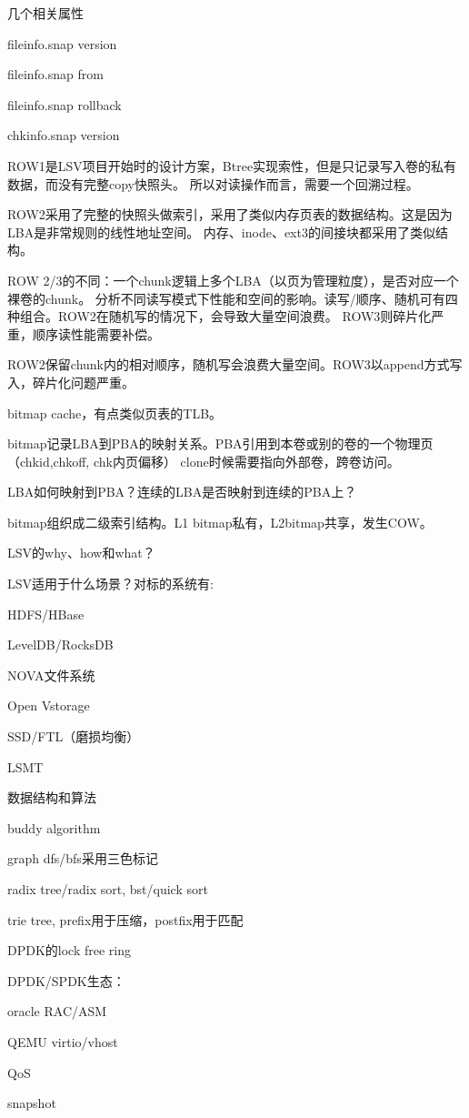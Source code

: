 几个相关属性
\begin{enumbox}
\item fileinfo.snap version
\item fileinfo.snap from
\item fileinfo.snap rollback
\item chkinfo.snap version
\end{enumbox}

\hrulefill

ROW1是LSV项目开始时的设计方案，Btree实现索性，但是只记录写入卷的私有数据，而没有完整copy快照头。
所以对读操作而言，需要一个回溯过程。

ROW2采用了完整的快照头做索引，采用了类似内存页表的数据结构。这是因为LBA是非常规则的线性地址空间。
内存、inode、ext3的间接块都采用了类似结构。

ROW 2/3的不同：一个chunk逻辑上多个LBA（以页为管理粒度），是否对应一个裸卷的chunk。
分析不同读写模式下性能和空间的影响。读写/顺序、随机可有四种组合。ROW2在随机写的情况下，会导致大量空间浪费。
ROW3则碎片化严重，顺序读性能需要补偿。

ROW2保留chunk内的相对顺序，随机写会浪费大量空间。ROW3以append方式写入，碎片化问题严重。

bitmap cache，有点类似页表的TLB。

bitmap记录LBA到PBA的映射关系。PBA引用到本卷或别的卷的一个物理页（chkid,chkoff, chk内页偏移）
clone时候需要指向外部卷，跨卷访问。

LBA如何映射到PBA？连续的LBA是否映射到连续的PBA上？

bitmap组织成二级索引结构。L1 bitmap私有，L2bitmap共享，发生COW。

\hrulefill

LSV的why、how和what？

LSV适用于什么场景？对标的系统有:
\begin{enumbox}
\item HDFS/HBase
\item LevelDB/RocksDB
\item NOVA文件系统
\item Open Vstorage
\item SSD/FTL（磨损均衡）
\item LSMT
\end{enumbox}

\hrulefill

数据结构和算法
\begin{enumbox}
\item buddy algorithm
\item graph dfs/bfs采用三色标记
\item radix tree/radix sort, bst/quick sort
\item trie tree, prefix用于压缩，postfix用于匹配
\item DPDK的lock free ring
\item DPDK/SPDK生态：
    \begin{enumbox}
    \item oracle RAC/ASM
    \item QEMU virtio/vhost
    \end{enumbox}
\item QoS
\item snapshot
\end{enumbox}

